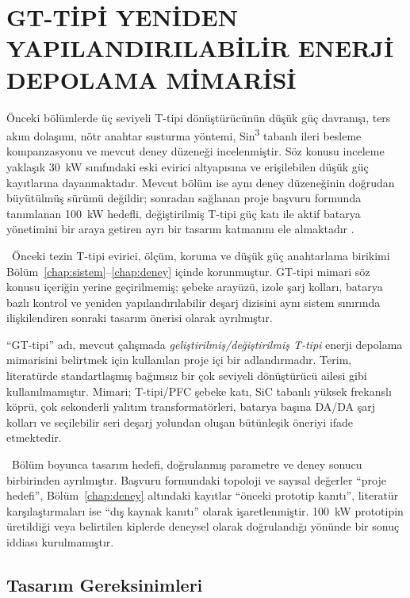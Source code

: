 \chapter{GT-TİPİ YENİDEN YAPILANDIRILABİLİR ENERJİ DEPOLAMA MİMARİSİ}
\label{chap:gttipi}

Önceki bölümlerde üç seviyeli T-tipi dönüştürücünün düşük güç davranışı, ters akım dolaşımı, nötr anahtar susturma yöntemi, Sin\textsuperscript{3} tabanlı ileri besleme kompanzasyonu ve mevcut deney düzeneği incelenmiştir. Söz konusu inceleme yaklaşık \SI{30}{\kilo\watt} sınıfındaki eski evirici altyapısına ve erişilebilen düşük güç kayıtlarına dayanmaktadır. Mevcut bölüm ise aynı deney düzeneğinin doğrudan büyütülmüş sürümü değildir; sonradan sağlanan proje başvuru formunda tanımlanan \SI{100}{\kilo\watt} hedefli, değiştirilmiş T-tipi güç katı ile aktif batarya yönetimini bir araya getiren ayrı bir tasarım katmanını ele almaktadır \citep{Arifoglu2023Basvuru}.

\eskitezetiketi\ Önceki tezin T-tipi evirici, ölçüm, koruma ve düşük güç anahtarlama birikimi Bölüm~\ref{chap:sistem}--\ref{chap:deney} içinde korunmuştur. GT-tipi mimari söz konusu içeriğin yerine geçirilmemiş; şebeke arayüzü, izole şarj kolları, batarya bazlı kontrol ve yeniden yapılandırılabilir deşarj dizisini aynı sistem sınırında ilişkilendiren sonraki tasarım önerisi olarak ayrılmıştır.

``GT-tipi'' adı, mevcut çalışmada \emph{geliştirilmiş/değiştirilmiş T-tipi} enerji depolama mimarisini belirtmek için kullanılan proje içi bir adlandırmadır. Terim, literatürde standartlaşmış bağımsız bir çok seviyeli dönüştürücü ailesi gibi kullanılmamıştır. Mimari; T-tipi/PFC şebeke katı, SiC tabanlı yüksek frekanslı köprü, çok sekonderli yalıtım transformatörleri, batarya başına DA/DA şarj kolları ve seçilebilir seri deşarj yolundan oluşan bütünleşik öneriyi ifade etmektedir.

\juriistegietiketi\ Bölüm boyunca tasarım hedefi, doğrulanmış parametre ve deney sonucu birbirinden ayrılmıştır. Başvuru formundaki topoloji ve sayısal değerler ``proje hedefi'', Bölüm~\ref{chap:deney} altındaki kayıtlar ``önceki prototip kanıtı'', literatür karşılaştırmaları ise ``dış kaynak kanıtı'' olarak işaretlenmiştir. \SI{100}{\kilo\watt} prototipin üretildiği veya belirtilen kiplerde deneysel olarak doğrulandığı yönünde bir sonuç iddiası kurulmamıştır.

\section{Tasarım Gereksinimleri}
\label{sec:gt-gereksinimler}

